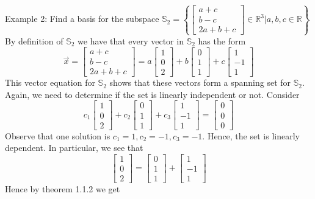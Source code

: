 \documentclass[10pt,letter]{article}
\begin{document}
Example 2: Find a basis for the subspace $\mathbb{S}_2=\left\{\begin{bmatrix}a+c\\b-c\\2a+b+c\end{bmatrix}\in\mathbb{R}^3|a,b,c\in\mathbb{R}\right\}$ \\ 
By definition of $\mathbb{S}_2$ we have that every vector in $\mathbb{S}_2$ has the form $$\vec{x}=\begin{bmatrix}a+c\\b-c\\2a+b+c\end{bmatrix}=a\begin{bmatrix}1\\0\\2\end{bmatrix}+b\begin{bmatrix}0\\1\\1\end{bmatrix}+c\begin{bmatrix}1\\-1\\1\end{bmatrix}$$ This vector equation for $\mathbb{S}_2$ shows that these vectors form a spanning set for $\mathbb{S}_2$. Again, we need to determine if the set is linearly independent or not. Consider $$c_1\begin{bmatrix}1\\0\\2\end{bmatrix}+c_2\begin{bmatrix}0\\1\\1\end{bmatrix}+c_3\begin{bmatrix}1\\-1\\1\end{bmatrix}=\begin{bmatrix}0\\0\\0\end{bmatrix}$$ Observe that one solution is $c_1=1,c_2=-1,c_3=-1$. Hence, the set is linearly dependent. In particular, we see that $$\begin{bmatrix}1\\0\\2\end{bmatrix}=\begin{bmatrix}0\\1\\1\end{bmatrix}+\begin{bmatrix}1\\-1\\1\end{bmatrix}$$ Hence by theorem 1.1.2 we get 
\end{document}
